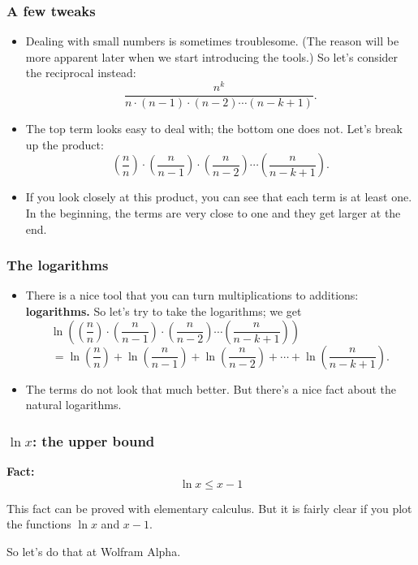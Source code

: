 \begin{frame}\frametitle{A few tweaks}
  \begin{itemize}
  \item Dealing with small numbers is sometimes troublesome. (The
    reason will be more apparent later when we start introducing the
    tools.)  So let's consider the reciprocal instead:
    \[\frac{n^k}{n\cdot (n-1)\cdot (n-2)\cdots (n-k+1)}.\]
    \pause
  \item The top term looks easy to deal with; the bottom one does not.
    Let's break up the product:
    \[\left(\frac{n}{n}\right)\cdot
    \left(\frac{n}{n-1}\right)\cdot\left(\frac{n}{n-2}\right)
    \cdots\left(\frac{n}{n-k+1}\right).\]
    \pause
  \item If you look closely at this product, you can see that each
    term is at least one.  In the beginning, the terms are very close
    to one and they get larger at the end.
  \end{itemize}
\end{frame}

\begin{frame}\frametitle{The logarithms}
  \begin{itemize}
  \item There is a nice tool that you can turn multiplications to
    additions: {\bf logarithms.}  So let's try to take the logarithms; \pause
    we get
    \[\ln\left(\left(\frac{n}{n}\right)\cdot
    \left(\frac{n}{n-1}\right)\cdot\left(\frac{n}{n-2}\right)
    \cdots\left(\frac{n}{n-k+1}\right)\right) \qquad \qquad \qquad \qquad \]
    \[ = \ln\left(\frac{n}{n}\right)+
    \ln\left(\frac{n}{n-1}\right)+\ln\left(\frac{n}{n-2}\right) +
    \cdots+\ln\left(\frac{n}{n-k+1}\right).\]
    \pause
  \item The terms do not look that much better.  But there's a nice
    fact about the natural logarithms.
  \end{itemize}
\end{frame}

\begin{frame}\frametitle{$\ln x$: the upper bound}
  \begin{tcolorbox}
    {\bf Fact:}
    \[\ln x \leq x - 1\]
  \end{tcolorbox}
  This fact can be proved with elementary calculus.  But it is fairly clear if you plot the functions $\ln x$ and $x-1$. \pause

  So let's do that at Wolfram Alpha.
  \vspace{1.2in}
\end{frame}

